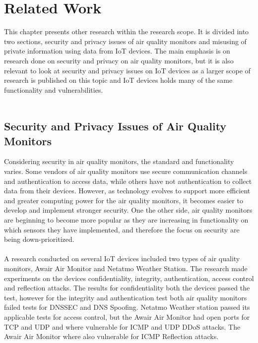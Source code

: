 \chapter{Related Work}
This chapter presents other research within the research scope. It is divided into two sections, security and privacy issues of air quality monitors and misusing of private information using data from IoT devices. The main emphasis is on research done on security and privacy on air quality monitors, but it is also relevant to look at security and privacy issues on IoT devices as a larger scope of research is published on this topic and IoT devices holds many of the same functionality and vulnerabilities.\\\\
\section{Security and Privacy Issues of Air Quality Monitors}
Considering security in air quality monitors, the standard and functionality varies. \cite{AQMHowFarFunctionality} Some vendors of air quality monitors use secure communication channels and authentication to access data, while others have not authentication to collect data from their devices. However, as technology evolves to support more efficient and greater computing power for the air quality monitors, it becomes easier to develop and implement stronger security. One the other side, air quality monitors are beginning to become more popular as they are increasing in functionality on which sensors they have implemented, and therefore the focus on security are being down-prioritized.\\\\
\cite{SecurityAndDataIntInAQM} 
A research conducted on several IoT devices included two types of air quality monitors, Awair Air Monitor and Netatmo Weather Station. \cite{IoTSecurityandPrivacyImpl} The research made experiments on the devices confidentiality, integrity, authentication, access control and reflection attacks. The results for confidentiality both the devices passed the test, however for the integrity and authentication test both air quality monitors failed tests for DNSSEC and DNS Spoofing. Netatmo Weather station passed its applicable tests for access control, but the Awair Air Monitor had open ports for TCP and UDP and where vulnerable for ICMP and UDP DDoS attacks. The Awair Air Monitor where also vulnerable for ICMP Reflection attacks. \cite{IoTSecurityandPrivacyImpl}
\\\\

